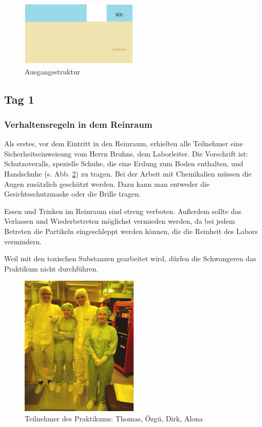 \begin{figure}[H]
    \centering
        \includegraphics[width=0.5\textwidth]{bilder/AusgangsStruktur.png}
    \caption{Ausgangsstruktur}
    \label{fig:AusgangsStruktur}
\end{figure}

\subsection[Tag 1]{Tag 1}

\subsubsection[Verhaltensregeln in dem Reinraum]{Verhaltensregeln in dem Reinraum}

Als erstes, vor dem Eintritt in den Reinraum, erhielten alle Teilnehmer eine Sicherheitseinweisung vom Herrn Bruhns, dem Laborleiter.
Die Vorschrift ist: Schutzoveralls, spezielle Schuhe, die eine Erdung zum Boden enthalten, und Handschuhe (s. Abb. \ref{fig:Teilnehmer}) zu tragen. Bei der Arbeit mit Chemikalien müssen die Augen zusätzlich geschützt werden. Dazu kann man entweder die Gesichtsschutzmaske oder die Brille
tragen.

Essen und Trinken im Reinraum sind streng verboten.
Außerdem sollte das Verlassen und Wiederbetreten möglichst vermieden werden, da bei jedem Betreten die Partikeln eingeschleppt werden können, die die Reinheit des Labors vermindern.

Weil mit den toxischen Substanzen gearbeitet wird, dürfen die Schwangeren das Praktikum nicht durchführen.

\begin{figure}[H]
    \centering
        \includegraphics[width=0.5\textwidth]{bilder/Teilnehmer.png}
    \caption{Teilnehmer des Praktikums: Thomas, Özgü, Dirk, Alona}
    \label{fig:Teilnehmer}
\end{figure}

